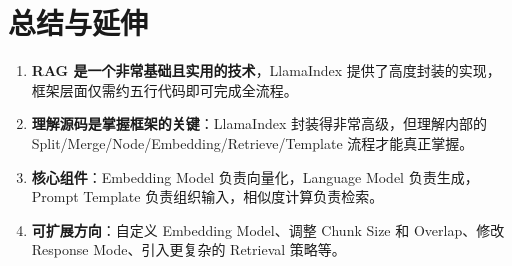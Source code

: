 \section{总结与延伸}

\begin{enumerate}
    \item \textbf{RAG 是一个非常基础且实用的技术}，LlamaIndex 提供了高度封装的实现，框架层面仅需约五行代码即可完成全流程。
    \item \textbf{理解源码是掌握框架的关键}：LlamaIndex 封装得非常高级，但理解内部的 Split/Merge/Node/Embedding/Retrieve/Template 流程才能真正掌握。
    \item \textbf{核心组件}：Embedding Model 负责向量化，Language Model 负责生成，Prompt Template 负责组织输入，相似度计算负责检索。
    \item \textbf{可扩展方向}：自定义 Embedding Model、调整 Chunk Size 和 Overlap、修改 Response Mode、引入更复杂的 Retrieval 策略等。
\end{enumerate}


